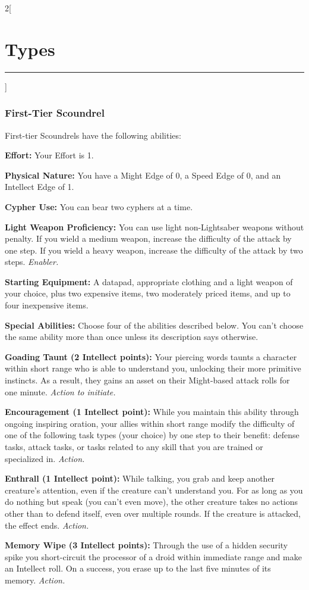 \documentclass[a4paper,10pt,final]{book}
\newcommand{\HRule}{\rule{\linewidth}{0.5mm}} %
\newcommand{\newSection}[1]{\section*{#1} \addcontentsline{toc}{section}{#1} \label{sec:#1} \HRule}
\newcommand{\itemLine}[2]{\textbf{#1:} {#2}\par}
\newcommand{\itemAbility}[2]{\textcolor{25gray}{\textbullet\textbf{ #1:}} {#2}\par}
\newcommand{\enabler}{\textit{ Enabler.}}
\newcommand{\action}{\textit{ Action.}}
\newcommand{\actionInit}{\textit{ Action to initiate.}}
\newenvironment{docsection}[1]
{
  \begin{multicols*}{2}[\newSection{#1}]
}
{
  \end{multicols*}
  \newpage
}
\begin{document}
\begin{docsection}{Types}
\subsubsection*{First-Tier Scoundrel}
\label{subsub:scoundrelFirstTier}

First-tier Scoundrels have the following abilities: \par

\itemLine{Effort}{Your Effort is 1.}

\itemLine{Physical Nature}{You have a Might Edge of 0, a Speed Edge of 0, and an Intellect Edge of 1.}

\itemLine{Cypher Use}{You can bear two cyphers at a time.}

\itemLine{Light Weapon Proficiency} {You can use light non-Lightsaber weapons without penalty. If you wield a medium weapon, increase the difficulty of the attack by one step. If you wield a heavy weapon, increase the difficulty of the attack by two steps.\enabler}

\itemLine{Starting Equipment} {A datapad, appropriate clothing and a light weapon of your choice, plus two expensive items, two moderately priced items, and up to four inexpensive items.}

\itemLine{Special Abilities}{Choose four of the abilities described below. You can’t choose the same ability more than once unless its description says otherwise.}

\itemAbility{Goading Taunt (2 Intellect points)}{Your
piercing words taunts a character within
short range who is able to understand you,
unlocking their more primitive instincts. As a
result, they gains an asset on their Might-based
attack rolls for one minute.\actionInit}

\itemAbility{Encouragement (1 Intellect point)}{While
you maintain this ability through ongoing inspiring oration, 
your allies within short range modify the difficulty of one of the
following task types (your choice) by one
step to their benefit: defense tasks, attack
tasks, or tasks related to any skill that you
are trained or specialized in.\action}

\itemAbility{Enthrall (1 Intellect point)}{While talking,
you grab and keep another creature’s
attention, even if the creature can’t
understand you. For as long as you do
nothing but speak (you can’t even move),
the other creature takes no actions other
than to defend itself, even over multiple
rounds. If the creature is attacked, the effect
ends.\action}

\itemAbility{Memory Wipe (3 Intellect points)}{Through the use
of a hidden security spike you short-circuit the processor of a droid within
immediate range and make an Intellect roll.
On a success, you erase up to the last five
minutes of its memory.\action}


\end{docsection}
\end{document}
